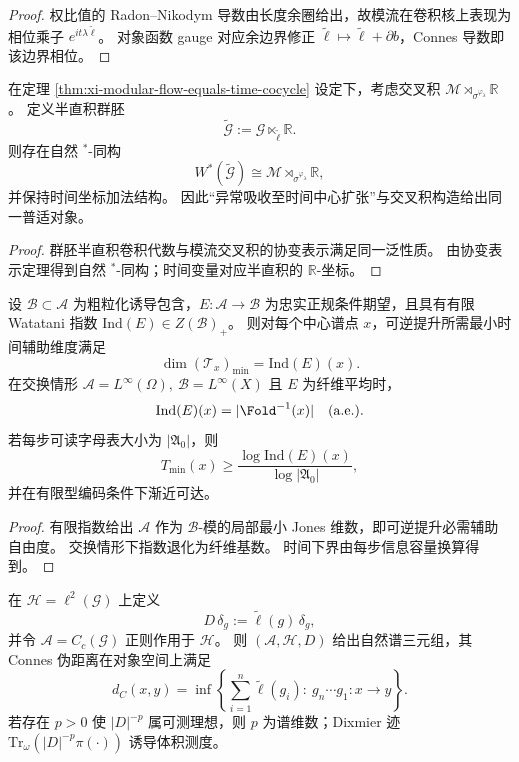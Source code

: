 \begin{proof}
权比值的 Radon--Nikodym 导数由长度余圈给出，故模流在卷积核上表现为相位乘子 \(e^{it\lambda\widetilde\ell}\)。
对象函数 gauge 对应余边界修正 \(\widetilde\ell\mapsto \widetilde\ell+\partial b\)，Connes 导数即该边界相位。
\end{proof}

\begin{theorem}\label{thm:xi-time-register-crossed-product-equivalence}
在定理 \ref{thm:xi-modular-flow-equals-time-cocycle} 设定下，考虑交叉积
\(
\mathcal M\rtimes_{\sigma^{\varphi_\lambda}}\mathbb R
\)。
定义半直积群胚
\[
\widetilde{\mathcal G}:=\mathcal G\ltimes_{\widetilde\ell}\mathbb R.
\]
则存在自然 \(^\ast\)-同构
\[
W^\ast(\widetilde{\mathcal G})
\cong
\mathcal M\rtimes_{\sigma^{\varphi_\lambda}}\mathbb R,
\]
并保持时间坐标加法结构。
因此“异常吸收至时间中心扩张”与交叉积构造给出同一普适对象。
\end{theorem}

\begin{proof}
群胚半直积卷积代数与模流交叉积的协变表示满足同一泛性质。
由协变表示定理得到自然 \(^\ast\)-同构；时间变量对应半直积的 \(\mathbb R\)-坐标。
\end{proof}

\begin{theorem}[局部指数即局部时间纤维维数]\label{thm:xi-local-index-equals-local-time-fiber}
设 \(\mathcal B\subset\mathcal A\) 为粗粒化诱导包含，\(E:\mathcal A\to\mathcal B\) 为忠实正规条件期望，且具有有限 Watatani 指数 \(\mathrm{Ind}(E)\in Z(\mathcal B)_+\)。
则对每个中心谱点 \(x\)，可逆提升所需最小时间辅助维度满足
\[
\dim(\mathcal T_x)_{\min}=\mathrm{Ind}(E)(x).
\]
在交换情形
\(
\mathcal A=L^\infty(\Omega),\ \mathcal B=L^\infty(X)
\)
且 \(E\) 为纤维平均时，
\[
\mathrm{Ind}(E)(x)=|\Fold^{-1}(x)|\quad\text{(a.e.)}.
\]
若每步可读字母表大小为 \(|\mathfrak A_0|\)，则
\[
T_{\min}(x)\ge \frac{\log \mathrm{Ind}(E)(x)}{\log |\mathfrak A_0|},
\]
并在有限型编码条件下渐近可达。
\end{theorem}

\begin{proof}
有限指数给出 \(\mathcal A\) 作为 \(\mathcal B\)-模的局部最小 Jones 维数，即可逆提升必需辅助自由度。
交换情形下指数退化为纤维基数。
时间下界由每步信息容量换算得到。
\end{proof}

\begin{theorem}\label{thm:xi-time-spectral-triple-distance-volume}
在 \(\mathcal H=\ell^2(\mathcal G)\) 上定义
\[
D\,\delta_g:=\widetilde\ell(g)\,\delta_g,
\]
并令 \(\mathcal A=C_c(\mathcal G)\) 正则作用于 \(\mathcal H\)。
则 \((\mathcal A,\mathcal H,D)\) 给出自然谱三元组，其 Connes 伪距离在对象空间上满足
\[
d_C(x,y)
=
\inf\left\{
\sum_{i=1}^n\widetilde\ell(g_i):\ g_n\cdots g_1:x\to y
\right\}.
\]
若存在 \(p>0\) 使 \(|D|^{-p}\) 属可测理想，则 \(p\) 为谱维数；Dixmier 迹
\(
\mathrm{Tr}_\omega(|D|^{-p}\pi(\cdot))
\)
诱导体积测度。
\end{theorem}

